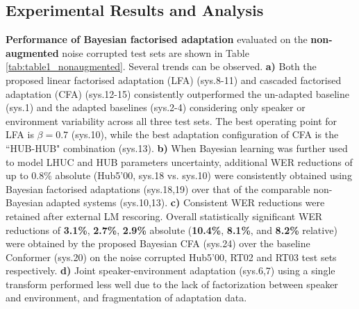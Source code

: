 \documentclass{INTERSPEECH2023}
\begin{document}
\vspace{-0.2cm}
\subsection{Experimental Results and Analysis}
\vspace{-0.1cm}
\textbf{Performance of Bayesian factorised adaptation} evaluated on the \textbf{non-augmented} noise corrupted test sets are shown in Table \ref{tab:table1_nonaugmented}. Several trends can be observed. \textbf{a)} Both the proposed linear factorised adaptation (LFA) (sys.8-11) and cascaded factorised adaptation (CFA) (sys.12-15) consistently outperformed the  un-adapted baseline (sys.1) and the adapted baselines (sys.2-4) considering only speaker or environment variability across all three test sets. The best operating point for LFA is $\beta=0.7$ (sys.10), while the best adaptation configuration of CFA is the “HUB-HUB" combination (sys.13). \textbf{b)} When Bayesian learning was further used to model LHUC and HUB parameters uncertainty, additional WER reductions of up to 0.8\% absolute (Hub5'00, sys.18 vs. sys.10) were consistently obtained using Bayesian factorised adaptations (sys.18,19) over that of the comparable non-Bayesian adapted systems (sys.10,13). \textbf{c)} Consistent WER reductions were retained after external LM rescoring. Overall statistically significant WER
reductions of \textbf{3.1\%}, \textbf{2.7\%}, \textbf{2.9\%} absolute (\textbf{10.4\%}, \textbf{8.1\%}, and \textbf{8.2\%} relative) were obtained by the proposed Bayesian CFA (sys.24) over the baseline Conformer (sys.20) on the noise corrupted Hub5’00, RT02 and RT03 test sets respectively. \textbf{d)} Joint speaker-environment adaptation (sys.6,7) using a single transform performed less well due to the lack of factorization between speaker and environment, and fragmentation of adaptation data. 
\end{document}
